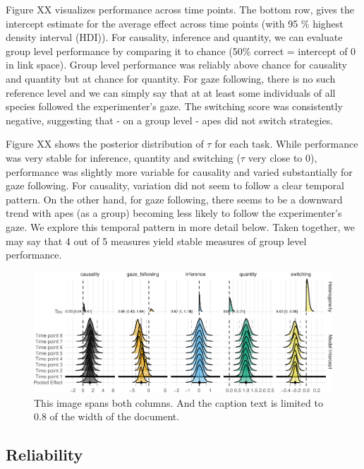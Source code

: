 \documentclass[10pt, letterpaper]{article}
\newenvironment{CodeChunk}{}{}
\begin{document}
Figure XX visualizes performance across time points. The bottom row,
gives the intercept estimate for the average effect across time points
(with 95 \% highest density interval (HDI)). For causality, inference
and quantity, we can evaluate group level performance by comparing it to
chance (50\% correct = intercept of 0 in link space). Group level
performance was reliably above chance for causality and quantity but at
chance for quantity. For gaze following, there is no such reference
level and we can simply say that at at least some individuals of all
species followed the experimenter's gaze. The switching score was
consistently negative, suggesting that - on a group level - apes did not
switch strategies.

Figure XX shows the posterior distribution of \(\tau\) for each task.
While performance was very stable for inference, quantity and switching
(\(\tau\) very close to 0), performance was slightly more variable for
causality and varied substantially for gaze following. For causality,
variation did not seem to follow a clear temporal pattern. On the other
hand, for gaze following, there seems to be a downward trend with apes
(as a group) becoming less likely to follow the experimenter's gaze. We
explore this temporal pattern in more detail below. Taken together, we
may say that 4 out of 5 measures yield stable measures of group level
performance.

\begin{CodeChunk}
\begin{figure}[h]

{\centering \includegraphics{figs/2-col-image3-1} 

}

\caption[This image spans both columns]{This image spans both columns. And the caption text is limited to 0.8 of the width of the document.}\label{fig:2-col-image3}
\end{figure}
\end{CodeChunk}

\hypertarget{reliability}{%
\subsection{Reliability}\label{reliability}}
\end{document}
